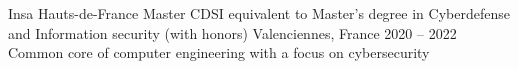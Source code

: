 
\begin{cventries}
  \cventry
    {Insa Hauts-de-France} %
    {Master CDSI equivalent to Master's degree in Cyberdefense and Information security (with honors)} %
    {Valenciennes, France} %
    {2020 – 2022} %
    {Common core of computer engineering with a focus on cybersecurity}
    

\end{cventries}
